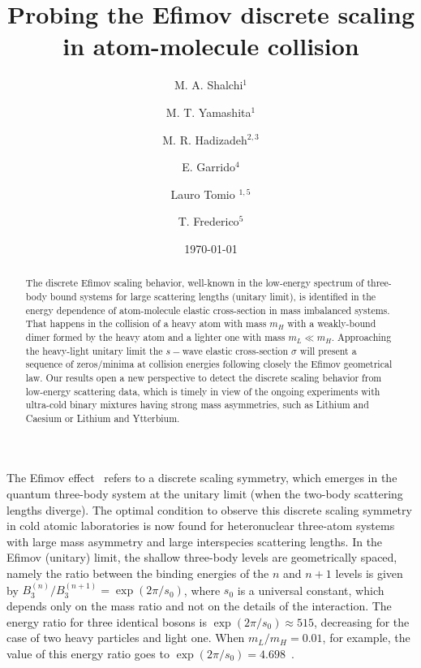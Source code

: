 \documentclass[twocolumn,amsmath,amssymb,epsfig,aps,prl]{revtex4}
\begin{document}
\title{Probing the Efimov discrete scaling in atom-molecule collision}
\author{M. A. Shalchi$^1$}
\author{M. T. Yamashita$^1$}
\author{M. R. Hadizadeh$^{2,3}$}
\author{E.  Garrido$^{4}$}
\author{Lauro Tomio $^{1,5}$} 
\author{T. Frederico$^5$}

\date{\today}

\begin{abstract}
The discrete Efimov scaling behavior, well-known in the low-energy spectrum of 
three-body bound systems for large scattering lengths (unitary limit), is identified 
in the energy dependence of atom-molecule elastic cross-section in mass imbalanced systems. 
That happens in the collision of a heavy atom with mass $m_H$ with a weakly-bound 
dimer formed by the heavy atom and a lighter one with mass $m_L \ll m_H$.
Approaching the heavy-light unitary limit the $s-$wave elastic cross-section $\sigma$ will present 
a sequence of zeros/minima at collision energies following closely
the Efimov geometrical law. Our results open a new
perspective to detect the discrete scaling behavior from low-energy scattering data, 
which is timely in view of the ongoing experiments with ultra-cold binary mixtures having strong 
mass asymmetries, such as Lithium and Caesium or Lithium and Ytterbium.
\end{abstract}

\maketitle



The Efimov effect~\cite{1970efimov} refers to a discrete scaling symmetry, which emerges in the quantum 
three-body system at the unitary limit (when the two-body scattering lengths diverge). 
The optimal condition to observe this discrete scaling symmetry 
in cold atomic laboratories is  now found for heteronuclear three-atom systems
with large mass asymmetry  and large interspecies scattering lengths.
In the Efimov (unitary) limit, the shallow three-body levels are geometrically spaced, namely 
the ratio between the binding energies of the $n$ and $n+1$ levels is given by $B_3^{(n)}/B_3^{(n+1)}=\exp{(2\pi /s_0)}$, 
where $s_0$ is a universal constant, which depends only on the mass ratio and not on 
the details of the interaction. The energy ratio for three identical bosons is
$\exp{(2\pi /s_0)}\approx 515$, decreasing for the case of two heavy particles and
light one. 
When $m_L/m_H  = 0.01 $, for example, the value of this energy ratio goes to 
$\exp{(2\pi /s_0)}= 4.698$~\cite{2006braaten}.
\end{document}
